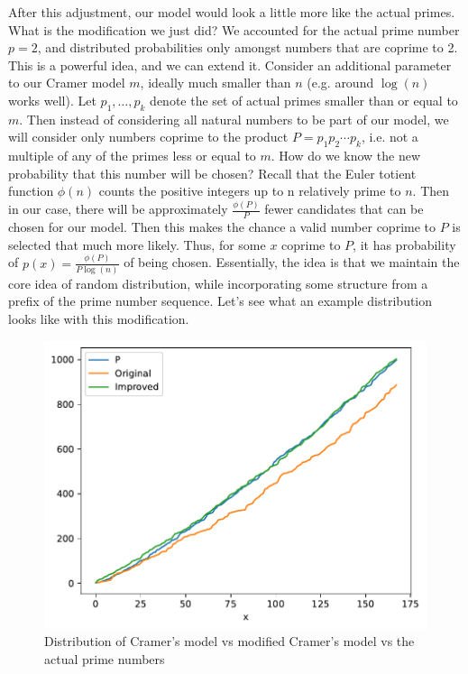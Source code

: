 \documentclass[conference]{IEEEtran}
\begin{document}
After this adjustment, our model would look a little more like the actual primes. What is the modification we just did? We accounted for the actual prime number $p = 2$, and distributed probabilities only amongst numbers that are coprime to 2. This is a powerful idea, and we can extend it. Consider an additional parameter to our Cramer model $m$, ideally much smaller than $n$ (e.g. around $\log(n)$\cite{b1} works well). Let $p_1, \dots, p_k$ denote the set of actual primes smaller than or equal to $m$. Then instead of considering all natural numbers to be part of our model, we will consider only numbers coprime to the product $P = p_1p_2\cdots p_k$, i.e. not a multiple of any of the primes less or equal to $m$. How do we know the new probability that this number will be chosen? Recall that the Euler totient function $\phi(n)$ counts the positive integers up to n relatively prime to $n$. Then in our case, there will be approximately $\frac{\phi(P)}{P}$ fewer candidates that can be chosen for our model. Then this makes the chance a valid number coprime to $P$ is selected that much more likely. Thus, for some $x$ coprime to $P$, it has probability of $p(x) = \frac{\phi(P)}{P\log(n)}$ of being chosen. Essentially, the idea is that we maintain the core idea of random distribution, while incorporating some structure from a prefix of the prime number sequence. Let's see what an example distribution looks like with this modification.

\begin{figure}[H]
  \centering
  \includegraphics[width=\linewidth,keepaspectratio]{../images/Improvement.pdf}
  \caption{Distribution of Cramer's model vs modified Cramer's model vs the actual prime numbers}
\end{figure}
\end{document}

